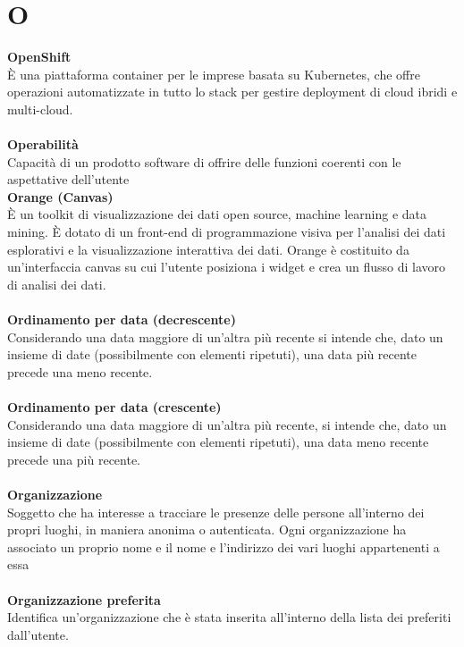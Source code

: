 \section{O}
\textbf{OpenShift}\\
È una piattaforma container per le imprese basata su Kubernetes, che offre operazioni automatizzate in tutto lo stack per gestire deployment di cloud ibridi e multi-cloud. \\ \\
\textbf{Operabilità}\\
Capacità di un prodotto software di offrire delle funzioni coerenti con le aspettative dell’utente\ \\
\textbf{Orange (Canvas)}\\
È un toolkit di visualizzazione dei dati open source, machine learning e data mining. È dotato di un front-end di programmazione visiva per l'analisi dei dati esplorativi e la visualizzazione interattiva dei dati. Orange è costituito da un'interfaccia canvas su cui l'utente posiziona i widget e crea un flusso di lavoro di analisi dei dati. \\ \\
\textbf{Ordinamento per data (decrescente)}\\
Considerando una data maggiore di un'altra più recente si intende che, dato un insieme di date (possibilmente con elementi ripetuti), una data più recente precede una meno recente. \\ \\
\textbf{Ordinamento per data (crescente)}\\
Considerando una data maggiore di un'altra più recente, si intende che, dato un insieme di date (possibilmente con elementi ripetuti), una data meno recente precede una più recente. \\ \\
\textbf{Organizzazione}\\
Soggetto che ha interesse a tracciare le presenze delle persone all’interno dei propri luoghi, in maniera anonima o autenticata. Ogni organizzazione ha associato un proprio nome e il nome e l'indirizzo dei vari luoghi appartenenti a essa \\ \\
\textbf{Organizzazione preferita}\\
Identifica un'organizzazione che è stata inserita all'interno della lista dei preferiti dall'utente. \\ \\
\clearpage